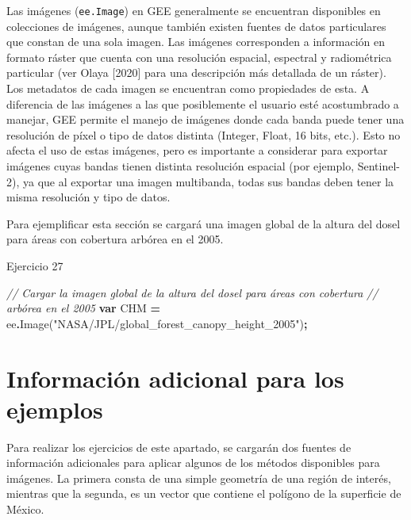 \documentclass[
  12pt,
  letterpaper,
  twoside]{book}
\newenvironment{Shaded}{\begin{snugshade}}{\end{snugshade}}
\newcommand{\CommentTok}[1]{\textcolor[rgb]{0.56,0.35,0.01}{\textit{#1}}}
\newcommand{\FunctionTok}[1]{\textcolor[rgb]{0.00,0.00,0.00}{#1}}
\newcommand{\KeywordTok}[1]{\textcolor[rgb]{0.13,0.29,0.53}{\textbf{#1}}}
\newcommand{\NormalTok}[1]{#1}
\newcommand{\OperatorTok}[1]{\textcolor[rgb]{0.81,0.36,0.00}{\textbf{#1}}}
\newcommand{\StringTok}[1]{\textcolor[rgb]{0.31,0.60,0.02}{#1}}
\begin{document}
Las imágenes (\texttt{ee.Image}) en GEE generalmente se encuentran disponibles en colecciones de imágenes, aunque también existen fuentes de datos particulares que constan de una sola imagen. Las imágenes corresponden a información en formato ráster que cuenta con una resolución espacial, espectral y radiométrica particular (ver Olaya {[}2020{]} para una descripción más detallada de un ráster). Los metadatos de cada imagen se encuentran como propiedades de esta. A diferencia de las imágenes a las que posiblemente el usuario esté acostumbrado a manejar, GEE permite el manejo de imágenes donde cada banda puede tener una resolución de píxel o tipo de datos distinta (Integer, Float, 16 bits, etc.). Esto no afecta el uso de estas imágenes, pero es importante a considerar para exportar imágenes cuyas bandas tienen distinta resolución espacial (por ejemplo, Sentinel-2), ya que al exportar una imagen multibanda, todas sus bandas deben tener la misma resolución y tipo de datos.

Para ejemplificar esta sección se cargará una imagen global de la altura del dosel para áreas con cobertura arbórea en el 2005.

Ejercicio 27

\begin{Shaded}
\begin{Highlighting}[]
\CommentTok{// Cargar la imagen global de la altura del dosel para áreas con cobertura }
\CommentTok{// arbórea en el 2005}
\KeywordTok{var}\NormalTok{ CHM }\OperatorTok{=}\NormalTok{ ee}\OperatorTok{.}\FunctionTok{Image}\NormalTok{(}\StringTok{"NASA/JPL/global\_forest\_canopy\_height\_2005"}\NormalTok{)}\OperatorTok{;}
\end{Highlighting}
\end{Shaded}

\hypertarget{informaciuxf3n-adicional-para-los-ejemplos}{%
\section{Información adicional para los ejemplos}\label{informaciuxf3n-adicional-para-los-ejemplos}}

Para realizar los ejercicios de este apartado, se cargarán dos fuentes de información adicionales para aplicar algunos de los métodos disponibles para imágenes. La primera consta de una simple geometría de una región de interés, mientras que la segunda, es un vector que contiene el polígono de la superficie de México.
\end{document}
